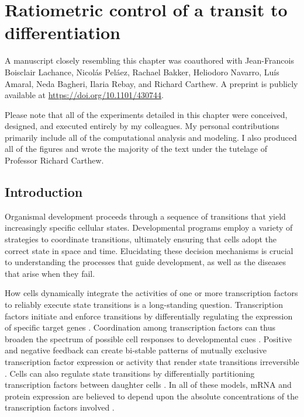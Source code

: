 
\graphicspath{ {figures/ratio/} }


\chapter{Ratiometric control of a transit to differentiation}
\label{ch:ratio}

A manuscript closely resembling this chapter was coauthored with Jean-Francois Boisclair Lachance, Nicol\'{a}s Pel\'{a}ez, Rachael Bakker, Heliodoro Navarro, Lu\'{i}s Amaral, Neda Bagheri, Ilaria Rebay, and Richard Carthew. A preprint is publicly available at \url{https://doi.org/10.1101/430744}.

Please note that all of the experiments detailed in this chapter were conceived, designed, and executed entirely by my colleagues. My personal contributions primarily include all of the computational analysis and modeling. I also produced all of the figures and wrote the majority of the text under the tutelage of Professor Richard Carthew.


\section{Introduction}

Organismal development proceeds through a sequence of transitions that yield increasingly specific cellular states. Developmental programs employ a variety of strategies to coordinate transitions, ultimately ensuring that cells adopt the correct state in space and time. Elucidating these decision mechanisms is crucial to understanding the processes that guide development, as well as the diseases that arise when they fail.

How cells dynamically integrate the activities of one or more transcription factors to reliably execute state transitions is a long-standing question. Transcription factors initiate and enforce transitions by differentially regulating the expression of specific target genes \cite{Zheng1997,Ducy1997,McGhee2009}. Coordination among transcription factors can thus broaden the spectrum of possible cell responses to developmental cues \cite{ORiordan1999,Evans2003}. Positive and negative feedback can create bi-stable patterns of mutually exclusive transcription factor expression or activity that render state transitions irreversible \cite{Melen2005,Kueh2013,Yao2008,Park2012}. Cells can also regulate state transitions by differentially partitioning transcription factors between daughter cells \cite{Wolff2018}. In all of these models, mRNA and protein expression are believed to depend upon the absolute concentrations of the transcription factors involved \cite{Tontonoz1994,Laslo2006,Raj2010,Niwa2000}.

